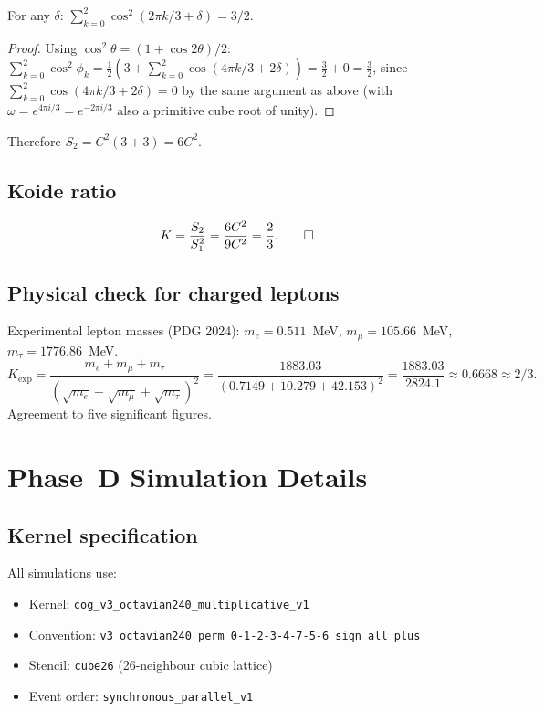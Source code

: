 \begin{lemma}
  For any $\delta$: $\sum_{k=0}^2 \cos^2(2\pi k/3 + \delta) = 3/2$.
\end{lemma}

\begin{proof}
  Using $\cos^2\theta = (1 + \cos 2\theta)/2$:
  $\sum_{k=0}^2 \cos^2\phi_k = \frac{1}{2}\left(3 + \sum_{k=0}^2 \cos(4\pi k/3 + 2\delta)\right) = \frac{3}{2} + 0 = \frac{3}{2}$,
  since $\sum_{k=0}^2 \cos(4\pi k/3 + 2\delta) = 0$ by the same argument as above
  (with $\omega = e^{4\pi i/3} = e^{-2\pi i/3}$ also a primitive cube root of unity).
\end{proof}

Therefore $S_2 = C^2(3 + 3) = 6C^2$.

\subsection{Koide ratio}

\begin{equation}
  K = \frac{S_2}{S_1^2} = \frac{6C^2}{9C^2} = \frac{2}{3} . \qed
\end{equation}

\subsection{Physical check for charged leptons}

Experimental lepton masses (PDG 2024):
$m_e = 0.511$~MeV, $m_\mu = 105.66$~MeV, $m_\tau = 1776.86$~MeV.
\begin{equation}
  K_{\mathrm{exp}} = \frac{m_e + m_\mu + m_\tau}{(\sqrt{m_e} + \sqrt{m_\mu} + \sqrt{m_\tau})^2}
  = \frac{1883.03}{(0.7149 + 10.279 + 42.153)^2} = \frac{1883.03}{2824.1} \approx 0.6668 \approx 2/3 .
\end{equation}
Agreement to five significant figures.

\section{Phase~D Simulation Details}
\label{app:simulation}

\subsection{Kernel specification}

All simulations use:
\begin{itemize}
  \item Kernel: \texttt{cog\_v3\_octavian240\_multiplicative\_v1}
  \item Convention: \texttt{v3\_octavian240\_perm\_0-1-2-3-4-7-5-6\_sign\_all\_plus}
  \item Stencil: \texttt{cube26} (26-neighbour cubic lattice)
  \item Event order: \texttt{synchronous\_parallel\_v1}
\end{itemize}

